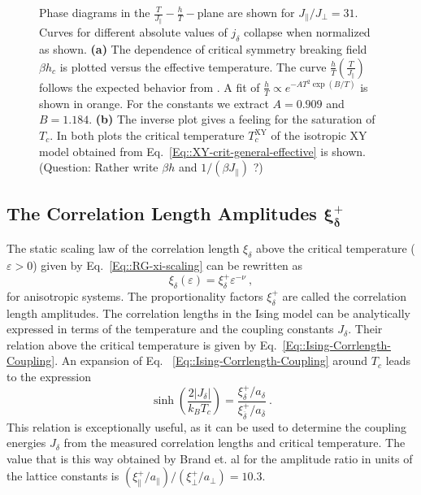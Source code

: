 \begin{figure}[htp]
\begin{subfigure}{0.9\textwidth}
		\end{subfigure}
		\caption{Phase diagrams in the $\tfrac{T}{J_\parallel} - \tfrac{h}{T}-$plane are shown for $J_\parallel /	J_\perp =	31$. Curves for different absolute values of $j_\delta$ collapse when normalized as shown.  \textbf{(a)} The dependence  of critical symmetry breaking field $\beta h_c$ is plotted versus the effective temperature. The curve $\tfrac{h}{T} \left(\tfrac{T}{J_\parallel}\right)$ follows the expected behavior from \cite{jose1977renormalization}. A fit of $\tfrac{h}{T} \propto e^{-AT^2 \exp({B/T})}$ is shown in orange. For the constants we extract $A=0.909$ and $B=1.184$. \textbf{(b)} The inverse plot gives a feeling for the saturation of $T_c$. In both plots the critical temperature $T_c^{\text{XY}}$ of the isotropic XY model obtained from Eq.~\eqref{Eq::XY-crit-general-effective} is shown. (Question: Rather write $\beta h$ and $1 /	(\beta J_\parallel)$ ?)}
		\label{Fig::Phase-Diagram-h}
	\end{figure}
	\subsection{The Correlation Length Amplitudes $\boldsymbol{\xi_\delta^+}$}
	The static scaling law of the correlation length $\xi_\delta$ above the critical temperature ($\varepsilon > 0$) given by Eq.~\eqref{Eq::RG-xi-scaling} can be rewritten as
	\begin{equation} \label{Eq::Xi-divergence-amplitude}
		\xi_\delta (\varepsilon) = \xi_\delta^{+} \varepsilon^{-\nu}~,
	\end{equation}
	for anisotropic systems. The proportionality factors $\xi_\delta^{+}$ are called the correlation length amplitudes. The correlation lengths in the Ising model can be analytically expressed in terms of the temperature and the coupling constants $J_\delta$. Their relation above the critical temperature is given by Eq.~\eqref{Eq::Ising-Corrlength-Coupling}. An expansion of Eq.~ \eqref{Eq::Ising-Corrlength-Coupling} around $T_c$ leads to the expression
	\begin{equation} \label{Eq::Ising-Ampl-ratio-xi}
		\sinh \left(\frac{2 |J_\delta|}{k_B T_c}\right) =	\frac{\xi_\delta^+ / a_\delta}{\xi_{\overline{\delta}}^+ / a_{\overline{\delta}}}~.
	\end{equation}
	This relation is exceptionally useful, as it can be used to determine the coupling energies $J_\delta$ from the measured correlation lengths and critical temperature. The value that is this way obtained by Brand et. al \cite{brand2023dimer, brand2023critical} for the amplitude ratio in units of the lattice constants is $({\xi_\parallel^+ / a_\parallel}) \big/	({\xi_{\perp}^+ / a_{\perp}}) =	10.3$.  \\
	
